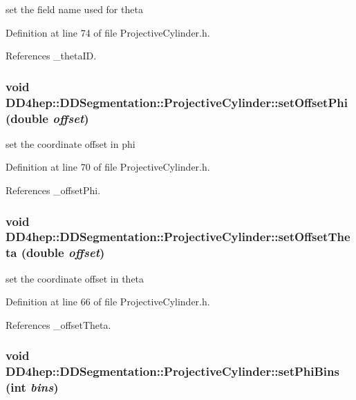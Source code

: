 set the field name used for theta 

Definition at line 74 of file ProjectiveCylinder.h.

References \_\-thetaID.\hypertarget{class_d_d4hep_1_1_d_d_segmentation_1_1_projective_cylinder_a0247ee2fcb59209e87206e4f2601b263}{
\subsubsection[{setOffsetPhi}]{\setlength{\rightskip}{0pt plus 5cm}void DD4hep::DDSegmentation::ProjectiveCylinder::setOffsetPhi (double {\em offset})}}
\label{class_d_d4hep_1_1_d_d_segmentation_1_1_projective_cylinder_a0247ee2fcb59209e87206e4f2601b263}


set the coordinate offset in phi 

Definition at line 70 of file ProjectiveCylinder.h.

References \_\-offsetPhi.\hypertarget{class_d_d4hep_1_1_d_d_segmentation_1_1_projective_cylinder_aa6c8515e197f47d176727c8fb6f935a0}{
\subsubsection[{setOffsetTheta}]{\setlength{\rightskip}{0pt plus 5cm}void DD4hep::DDSegmentation::ProjectiveCylinder::setOffsetTheta (double {\em offset})}}
\label{class_d_d4hep_1_1_d_d_segmentation_1_1_projective_cylinder_aa6c8515e197f47d176727c8fb6f935a0}


set the coordinate offset in theta 

Definition at line 66 of file ProjectiveCylinder.h.

References \_\-offsetTheta.\hypertarget{class_d_d4hep_1_1_d_d_segmentation_1_1_projective_cylinder_a39fb4bdacbf4c6e929a2b3c70d51f7c4}{
\subsubsection[{setPhiBins}]{\setlength{\rightskip}{0pt plus 5cm}void DD4hep::DDSegmentation::ProjectiveCylinder::setPhiBins (int {\em bins})}}
\label{class_d_d4hep_1_1_d_d_segmentation_1_1_projective_cylinder_a39fb4bdacbf4c6e929a2b3c70d51f7c4}


